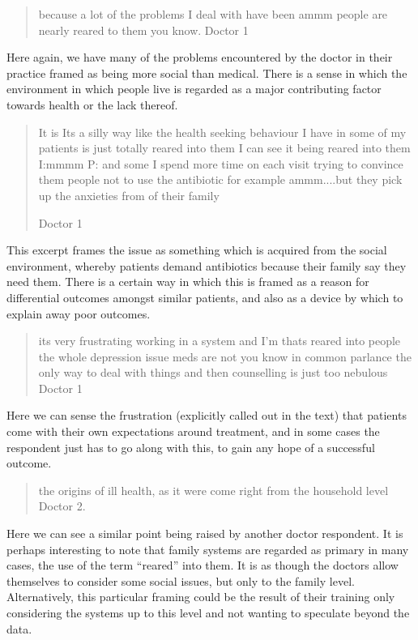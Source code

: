 \begin{quotation}
  because a lot of the problems I deal with have been ammm people are nearly reared to them you know. 
Doctor 1
\end{quotation}


Here again, we have many of the problems encountered by the doctor in their practice framed as  being more social than medical. There is a sense in which the environment in which people live is regarded as a major contributing factor towards health or the lack thereof. 

\begin{quotation}
  It is Its a silly way like the health seeking behaviour I have in some of my patients is just totally reared into them I can see it being reared into them 
I:mmmm
P: and some I spend more time on each visit trying to convince them people not to use the antibiotic for example ammm....but they pick up the anxieties from of their family

Doctor 1
\end{quotation}


This excerpt frames the issue as something which is acquired from the social environment, whereby patients demand antibiotics because their family say they need them. There is a certain way in which this is framed as a reason for differential outcomes amongst similar patients, and also as a device by which to explain away poor outcomes. 

\begin{quotation}
  its very frustrating working in a system and I'm thats reared into people the whole depression issue meds are not you know in common parlance the only way to deal with things and then counselling is just too nebulous 
Doctor 1
\end{quotation}

Here we can sense the frustration (explicitly called out in the text) that patients come with their own expectations around treatment, and in some cases the respondent just has to go along with this, to gain any hope of a successful outcome. 

\begin{quotation}
   the origins of ill health, as it were come right from the household level
Doctor 2.
\end{quotation}

Here we can see a similar point being raised by another doctor respondent. It is perhaps interesting to note that family systems are regarded as primary in many cases, the use of the term ``reared'' into them. It is as though the doctors allow themselves to consider some social issues, but only to the family level. Alternatively, this particular framing could be the result of their training only considering the systems up to this level and not wanting to speculate beyond the data. 


